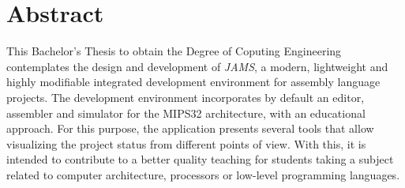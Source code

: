 \chapter{Abstract} \label{ch:abstract}

This Bachelor's Thesis to obtain the Degree of Coputing Engineering contemplates the design and development of \textit{JAMS},
a modern, lightweight and highly modifiable integrated
development environment for assembly language projects.
The development environment incorporates by default an editor,
assembler and simulator for the MIPS32 architecture, with an educational approach.
For this purpose, the application presents several tools that allow visualizing
the project status from different points of view.
With this, it is intended to contribute to a better quality
teaching for students taking a subject related to computer architecture,
processors or low-level programming languages.
